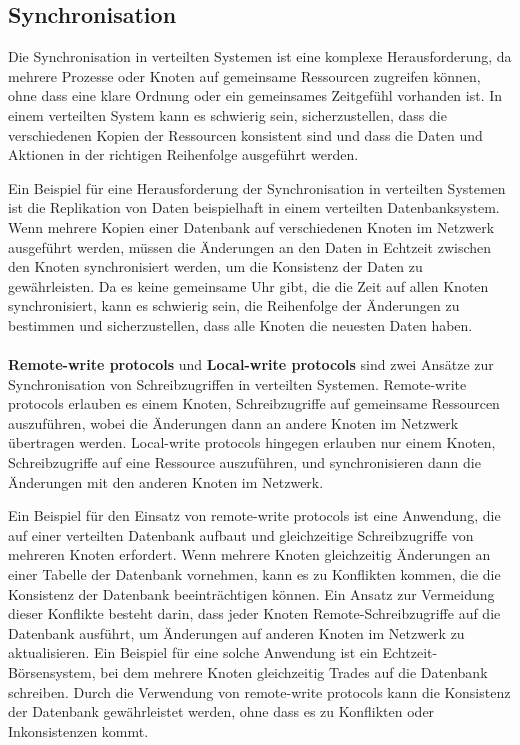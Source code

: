 \subsection{Synchronisation}

Die Synchronisation in verteilten Systemen ist eine komplexe Herausforderung, da mehrere Prozesse oder Knoten auf gemeinsame Ressourcen zugreifen können, ohne dass eine klare Ordnung oder ein gemeinsames Zeitgefühl vorhanden ist. In einem verteilten System kann es schwierig sein, sicherzustellen, dass die verschiedenen Kopien der Ressourcen konsistent sind und dass die Daten und Aktionen in der richtigen Reihenfolge ausgeführt werden.

Ein Beispiel für eine Herausforderung der Synchronisation in verteilten Systemen ist die Replikation von Daten beispielhaft in einem verteilten Datenbanksystem. Wenn mehrere Kopien einer Datenbank auf verschiedenen Knoten im Netzwerk ausgeführt werden, müssen die Änderungen an den Daten in Echtzeit zwischen den Knoten synchronisiert werden, um die Konsistenz der Daten zu gewährleisten. Da es keine gemeinsame Uhr gibt, die die Zeit auf allen Knoten synchronisiert, kann es schwierig sein, die Reihenfolge der Änderungen zu bestimmen und sicherzustellen, dass alle Knoten die neuesten Daten haben.
\\\\
\textbf{Remote-write protocols} und \textbf{Local-write protocols} sind zwei Ansätze zur Synchronisation von Schreibzugriffen in verteilten Systemen. Remote-write protocols erlauben es einem Knoten, Schreibzugriffe auf gemeinsame Ressourcen auszuführen, wobei die Änderungen dann an andere Knoten im Netzwerk übertragen werden. Local-write protocols hingegen erlauben nur einem Knoten, Schreibzugriffe auf eine Ressource auszuführen, und synchronisieren dann die Änderungen mit den anderen Knoten im Netzwerk.

Ein Beispiel für den Einsatz von remote-write protocols ist eine Anwendung, die auf einer verteilten Datenbank aufbaut und gleichzeitige Schreibzugriffe von mehreren Knoten erfordert. Wenn mehrere Knoten gleichzeitig Änderungen an einer Tabelle der Datenbank vornehmen, kann es zu Konflikten kommen, die die Konsistenz der Datenbank beeinträchtigen können. Ein Ansatz zur Vermeidung dieser Konflikte besteht darin, dass jeder Knoten Remote-Schreibzugriffe auf die Datenbank ausführt, um Änderungen auf anderen Knoten im Netzwerk zu aktualisieren. Ein Beispiel für eine solche Anwendung ist ein Echtzeit-Börsensystem, bei dem mehrere Knoten gleichzeitig Trades auf die Datenbank schreiben. Durch die Verwendung von remote-write protocols kann die Konsistenz der Datenbank gewährleistet werden, ohne dass es zu Konflikten oder Inkonsistenzen kommt.

